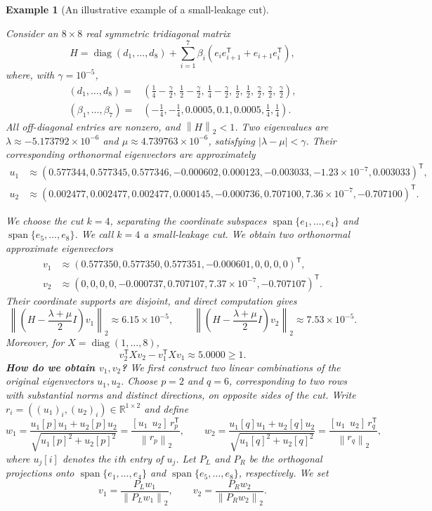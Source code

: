 \documentclass[10pt,a4paper]{article}
\newtheorem{example}{Example}[section]
\newcommand{\norm}[1]{\left\lVert #1\right\rVert}
\DeclareMathOperator{\diag}{diag}
\DeclareMathOperator{\spn}{span}
\newcommand{\R}{\mathbb R}
\begin{document}
\begin{example}[An illustrative example of a small-leakage cut]
\label{ex:localization}

Consider an $8\times8$ real symmetric tridiagonal matrix
\[
H=\diag(d_1,\ldots,d_8)
+\sum_{i=1}^7\beta_i
(e_ie_{i+1}^{\mathsf T}+e_{i+1}e_i^{\mathsf T}),
\]
where, with $\gamma=10^{-5}$,
\[
\begin{aligned}
(d_1,\ldots,d_8)
={}&
\left(\frac14-\frac\gamma2,\,
\frac12-\frac\gamma2,\,
\frac14-\frac\gamma2,\,
\frac12,\,\frac12,\,
\frac\gamma2,\,\frac\gamma2,\,\frac\gamma2\right),\\
(\beta_1,\ldots,\beta_7)
={}&
\left(-\frac14,-\frac14,0.0005,0.1,
0.0005,\frac14,\frac14\right).
\end{aligned}
\]
All off-diagonal entries are nonzero, and $\norm{H}_2<1$. 
Two eigenvalues are
$\lambda\approx-5.173792\times10^{-6}$ and
$\mu\approx4.739763\times10^{-6}$, satisfying
$|\lambda-\mu|<\gamma$.
Their corresponding orthonormal eigenvectors are
approximately
\[
\begin{aligned}
u_1&\approx(0.577344,0.577345,0.577346,-0.000602,
0.000123,-0.003033,-1.23\times10^{-7},0.003033)^{\mathsf T},\\
u_2&\approx(0.002477,0.002477,0.002477,0.000145,
-0.000736,0.707100,7.36\times10^{-7},-0.707100)^{\mathsf T}.
\end{aligned}
\]

We choose the cut $k=4$, separating the coordinate
subspaces $\spn\{e_1,\ldots,e_4\}$ and
$\spn\{e_5,\ldots,e_8\}$. 
We call $k=4$ a small-leakage cut. 
We obtain two orthonormal approximate eigenvectors
\[
\begin{aligned}
v_1&\approx(0.577350,0.577350,0.577351,-0.000601,
0,0,0,0)^{\mathsf T},\\
v_2&\approx(0,0,0,0,-0.000737,0.707107,
7.37\times10^{-7},-0.707107)^{\mathsf T}.
\end{aligned}
\]
Their coordinate supports are disjoint, and direct
computation gives
\[
\norm{\left(H-\frac{\lambda+\mu}{2}I\right)v_1}_2
\approx6.15\times10^{-5},\qquad
\norm{\left(H-\frac{\lambda+\mu}{2}I\right)v_2}_2
\approx7.53\times10^{-5}.
\]
Moreover, for $X=\diag(1,\ldots,8)$,
\[
v_2^{\mathsf T}Xv_2-v_1^{\mathsf T}Xv_1
\approx5.0000\geq1.
\]
\textbf{How do we obtain $v_1,v_2$?} We first construct two linear
combinations of the original eigenvectors $u_1,u_2$.
Choose $p=2$ and $q=6$, corresponding to two rows
with substantial norms and distinct directions,
on opposite sides of the cut. Write $r_i=((u_1)_i,(u_2)_i)\in\R^{1\times2}$ and define
\[
w_1=\frac{u_1[p]u_1+u_2[p]u_2}
{\sqrt{u_1[p]^2+u_2[p]^2}}=\frac{[u_1\ \ u_2]\,r_p^{\mathsf T}}{\norm{r_p}_2},
\qquad
w_2=\frac{u_1[q]u_1+u_2[q]u_2}
{\sqrt{u_1[q]^2+u_2[q]^2}}=\frac{[u_1\ \ u_2]\,r_q^{\mathsf T}}{\norm{r_q}_2},
\]
where $u_j[i]$ denotes the $i$th entry of $u_j$.
Let $P_L$ and $P_R$ be the orthogonal projections
onto $\spn\{e_1,\ldots,e_4\}$ and
$\spn\{e_5,\ldots,e_8\}$, respectively. We set
\[
v_1=\frac{P_Lw_1}{\norm{P_Lw_1}_2},
\qquad
v_2=\frac{P_Rw_2}{\norm{P_Rw_2}_2}.
\]
\end{example}
\end{document}
